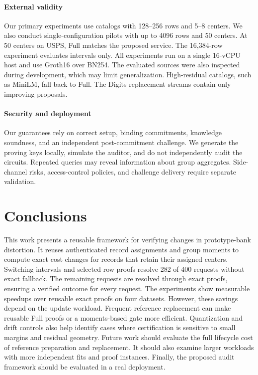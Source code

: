\documentclass[5p,times,twocolumn]{elsarticle}
\begin{document}
\paragraph{External validity}
Our primary experiments use catalogs with 128--256 rows and 5--8 centers. We also conduct single-configuration pilots with up to 4096 rows and 50 centers. At 50 centers on USPS, Full matches the proposed service. The 16{,}384-row experiment evaluates intervals only. All experiments run on a single 16-vCPU host and use Groth16 over BN254. The evaluated sources were also inspected during development, which may limit generalization. High-residual catalogs, such as MiniLM, fall back to Full. The Digits replacement streams contain only improving proposals.

\paragraph{Security and deployment}
Our guarantees rely on correct setup, binding commitments, knowledge soundness, and an independent post-commitment challenge. We generate the proving keys locally, simulate the auditor, and do not independently audit the circuits. Repeated queries may reveal information about group aggregates. Side-channel risks, access-control policies, and challenge delivery require separate validation.

\section{Conclusions}
This work presents a reusable framework for verifying changes in prototype-bank distortion. It reuses authenticated record assignments and group moments to compute exact cost changes for records that retain their assigned centers. Switching intervals and selected row proofs resolve 282 of 400 requests without exact fallback. The remaining requests are resolved through exact proofs, ensuring a verified outcome for every request.
The experiments show measurable speedups over reusable exact proofs on four datasets. However, these savings depend on the update workload. Frequent reference replacement can make reusable Full proofs or a moments-based gate more efficient. Quantization and drift controls also help identify cases where certification is sensitive to small margins and residual geometry.
Future work should evaluate the full lifecycle cost of reference preparation and replacement. It should also examine larger workloads with more independent fits and proof instances. Finally, the proposed audit framework should be evaluated in a real deployment.
\end{document}
